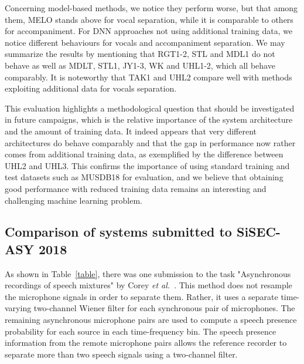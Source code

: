 \documentclass{llncs}
\begin{document}
Concerning model-based methods, we notice they perform worse, but that among them, MELO stands above for vocal separation, while it is comparable to others for accompaniment. For DNN approaches not using additional training data, we notice different behaviours for vocals and accompaniment separation. We may summarize the results by mentioning that RGT1-2, STL and MDL1 do not behave as well as MDLT, STL1, JY1-3, WK and UHL1-2, which all behave comparably. It is noteworthy that TAK1 and UHL2 compare well with methods exploiting additional data for vocals separation.

 This evaluation highlights a methodological question that should be investigated in future campaigns, which is the relative importance of the system architecture and the amount of training data. It indeed appears that very different architectures do behave comparably and that the gap in performance now rather comes from additional training data, as exemplified by the difference between UHL2 and UHL3. This confirms the importance of using standard training and test datasets such as MUSDB18 for evaluation, and we believe that obtaining good performance with reduced training data remains an interesting and challenging machine learning problem.


\subsection{Comparison of systems submitted to SiSEC-ASY 2018}
As shown in Table~\ref{table}, there was one submission to the task "Asynchronous recordings of speech mixtures" by Corey {\it et al.}~\cite{corey}.
This method does not resample the microphone signals in order to separate them. Rather, it uses a separate time-varying two-channel Wiener filter for each synchronous pair of microphones. The remaining asynchronous microphone pairs are used to compute a speech presence probability for each source in each time-frequency bin. The speech presence information from the remote microphone pairs allows the reference recorder to separate more than two speech signals using a two-channel filter.
\end{document}
